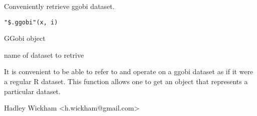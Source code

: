 \aliasA{[.ggobi}{"\$.ggobi"}{[.ggobi}
\begin{Description}\relax
Conveniently retrieve ggobi dataset.
\end{Description}
\begin{Usage}
\begin{verbatim}"$.ggobi"(x, i)\end{verbatim}
\end{Usage}
\begin{Arguments}
\begin{ldescription}
\item[\code{x}] GGobi object
\item[\code{i}] name of dataset to retrive
\end{ldescription}
\end{Arguments}
\begin{Details}\relax
It is convenient to be able to refer to and operate on a ggobi
dataset as if it were a regular R dataset.  This function allows one to
get an  object that represents a particular
dataset.
\end{Details}
\begin{Author}\relax
Hadley Wickham <h.wickham@gmail.com>
\end{Author}
\begin{Examples}
\end{Examples}

